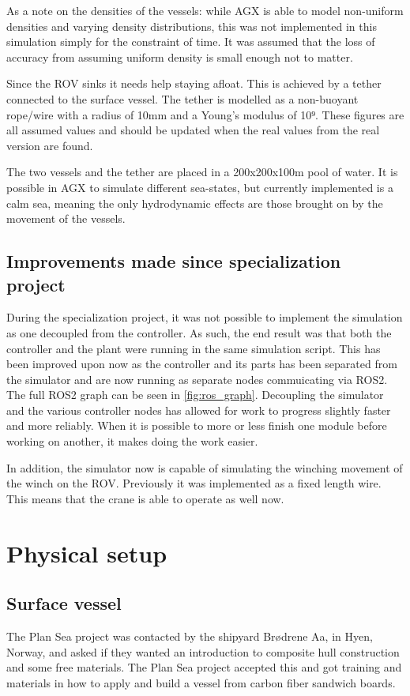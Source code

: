 \documentclass[class=article, crop=false]{standalone}
\begin{document}
As a note on the densities of the vessels: while AGX is able to model non-uniform densities and varying density distributions, this was not implemented in this simulation simply for the constraint of time. It was assumed that the loss of accuracy from assuming uniform density is small enough not to matter.

Since the ROV sinks it needs help staying afloat. This is achieved by a tether connected to the surface vessel. The tether is modelled as a non-buoyant rope/wire with a radius of 10mm and a Young's modulus of 10⁹. These figures are all assumed values and should be updated when the real values from the real version are found.

The two vessels and the tether are placed in a 200x200x100m pool of water. It is possible in AGX to simulate different sea-states, but currently implemented is a calm sea, meaning the only hydrodynamic effects are those brought on by the movement of the vessels.


\subsection{Improvements made since specialization project}
During the specialization project, it was not possible to implement the simulation as one decoupled from the controller. As such, the end result was that both the controller and the plant were running in the same simulation script. This has been improved upon now as the controller and its parts has been separated from the simulator and are now running as separate nodes commuicating via ROS2. The full ROS2 graph can be seen in \cref{fig:ros_graph}. Decoupling the simulator and the various controller nodes has allowed for work to progress slightly faster and more reliably. When it is possible to more or less finish one module before working on another, it makes doing the work easier.

In addition, the simulator now is capable of simulating the winching movement of the winch on the ROV. Previously it was implemented as a fixed length wire. This means that the crane is able to operate as well now.

\section{Physical setup}
\subsection{Surface vessel}
The Plan Sea project was contacted by the shipyard Brødrene Aa, in Hyen, Norway, and asked if they wanted an introduction to composite hull construction and some free materials. The Plan Sea project accepted this and got training and materials in how to apply and build a vessel from carbon fiber sandwich boards.
\end{document}
